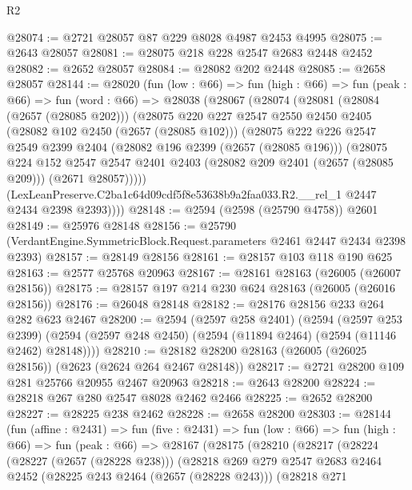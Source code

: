 \begin{lexlean}{R2}
\begin{coremodule}
@28074 := @2721 @28057 @87 @229 @8028 @4987 @2453 @4995
@28075 := @2643 @28057
@28081 := @28075 @218 @228 @2547 @2683 @2448 @2452
@28082 := @2652 @28057
@28084 := @28082 @202 @2448
@28085 := @2658 @28057
@28144 := @28020
    (fun (low : @66) =>
    fun (high : @66) =>
    fun (peak : @66) =>
    fun (word : @66) =>
    @28038
      (@28067
        (@28074
          (@28081
            (@28084 (@2657 (@28085 @202)))
            (@28075
              @220
              @227
              @2547
              @2550
              @2450
              @2405
              (@28082 @102 @2450 (@2657 (@28085 @102)))
              (@28075
                @222
                @226
                @2547
                @2549
                @2399
                @2404
                (@28082 @196 @2399 (@2657 (@28085 @196)))
                (@28075
                  @224
                  @152
                  @2547
                  @2547
                  @2401
                  @2403
                  (@28082 @209 @2401 (@2657 (@28085 @209)))
                  (@2671 @28057)))))
          (LexLeanPreserve.C2ba1c64d09cdf5f8e53638b9a2faa033.R2.__rel_1 @2447 @2434 @2398 @2393))))
@28148 := @2594 (@2598 (@25790 @4758)) @2601
@28149 := @25976 @28148
@28156 := @25790 (VerdantEngine.SymmetricBlock.Request.parameters @2461 @2447 @2434 @2398 @2393)
@28157 := @28149 @28156
@28161 := @28157 @103 @118 @190 @625
@28163 := @2577 @25768 @20963
@28167 := @28161 @28163 (@26005 (@26007 @28156))
@28175 := @28157 @197 @214 @230 @624 @28163 (@26005 (@26016 @28156))
@28176 := @26048 @28148
@28182 := @28176 @28156 @233 @264 @282 @623 @2467
@28200 := @2594
    (@2597 @258 @2401)
    (@2594
      (@2597 @253 @2399)
      (@2594 (@2597 @248 @2450) (@2594 (@11894 @2464) (@2594 (@11146 @2462) @28148))))
@28210 := @28182 @28200 @28163 (@26005 (@26025 @28156)) (@2623 (@2624 @264 @2467 @28148))
@28217 := @2721 @28200 @109 @281 @25766 @20955 @2467 @20963
@28218 := @2643 @28200
@28224 := @28218 @267 @280 @2547 @8028 @2462 @2466
@28225 := @2652 @28200
@28227 := @28225 @238 @2462
@28228 := @2658 @28200
@28303 := @28144
    (fun (affine : @2431) =>
    fun (five : @2431) =>
    fun (low : @66) =>
    fun (high : @66) =>
    fun (peak : @66) =>
    @28167
      (@28175
        (@28210
          (@28217
            (@28224
              (@28227 (@2657 (@28228 @238)))
              (@28218
                @269
                @279
                @2547
                @2683
                @2464
                @2452
                (@28225 @243 @2464 (@2657 (@28228 @243)))
                (@28218
                  @271

\end{coremodule}
\end{lexlean}
